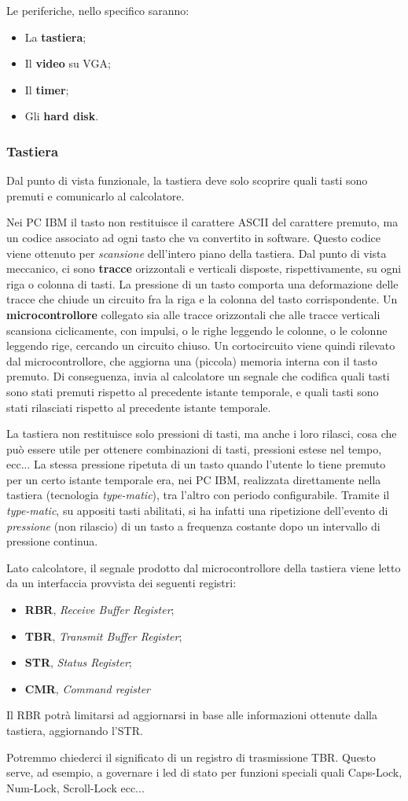 \documentclass[a4paper,11pt]{article}
\begin{document}
Le periferiche, nello specifico saranno:
\begin{itemize}
	\item La \textbf{tastiera};
	\item Il \textbf{video} su VGA;
	\item Il \textbf{timer};
	\item Gli \textbf{hard disk}.
\end{itemize}

\subsubsection{Tastiera}
Dal punto di vista funzionale, la tastiera deve solo scoprire quali tasti sono premuti e comunicarlo al calcolatore.

Nei PC IBM il tasto non restituisce il carattere ASCII del carattere premuto, ma un codice associato ad ogni tasto che va convertito in software.
Questo codice viene ottenuto per \textit{scansione} dell'intero piano della tastiera.
Dal punto di vista meccanico, ci sono \textbf{tracce} orizzontali e verticali disposte, rispettivamente, su ogni riga o colonna di tasti.
La pressione di un tasto comporta una deformazione delle tracce che chiude un circuito fra la riga e la colonna del tasto corrispondente.
Un \textbf{microcontrollore} collegato sia alle tracce orizzontali che alle tracce verticali scansiona ciclicamente, con impulsi, o le righe leggendo le colonne, o le colonne leggendo rige, cercando un circuito chiuso.
Un cortocircuito viene quindi rilevato dal microcontrollore, che aggiorna una (piccola) memoria interna con il tasto premuto.
Di conseguenza, invia al calcolatore un segnale che codifica quali tasti sono stati premuti rispetto al precedente istante temporale, e quali tasti sono stati rilasciati rispetto al precedente istante temporale. 

La tastiera non restituisce solo pressioni di tasti, ma anche i loro rilasci, cosa che può essere utile per ottenere combinazioni di tasti, pressioni estese nel tempo, ecc...
La stessa pressione ripetuta di un tasto quando l'utente lo tiene premuto per un certo istante temporale era, nei PC IBM, realizzata direttamente nella tastiera (tecnologia \textit{type-matic}), tra l'altro con periodo configurabile.
Tramite il \textit{type-matic}, su appositi tasti abilitati, si ha infatti una ripetizione dell'evento di \textit{pressione} (non rilascio) di un tasto a frequenza costante dopo un intervallo di pressione continua.

Lato calcolatore, il segnale prodotto dal microcontrollore della tastiera viene letto da un interfaccia provvista dei seguenti registri:
\begin{itemize}
	\item \textbf{RBR}, \textit{Receive Buffer Register};
	\item \textbf{TBR}, \textit{Transmit Buffer Register};
	\item \textbf{STR}, \textit{Status Register};
	\item \textbf{CMR}, \textit{Command register}
\end{itemize}

Il RBR potrà limitarsi ad aggiornarsi in base alle informazioni ottenute dalla tastiera, aggiornando l'STR.

Potremmo chiederci il significato di un registro di trasmissione TBR.
Questo serve, ad esempio, a governare i led di stato per funzioni speciali quali Caps-Lock, Num-Lock, Scroll-Lock ecc...
\end{document}
